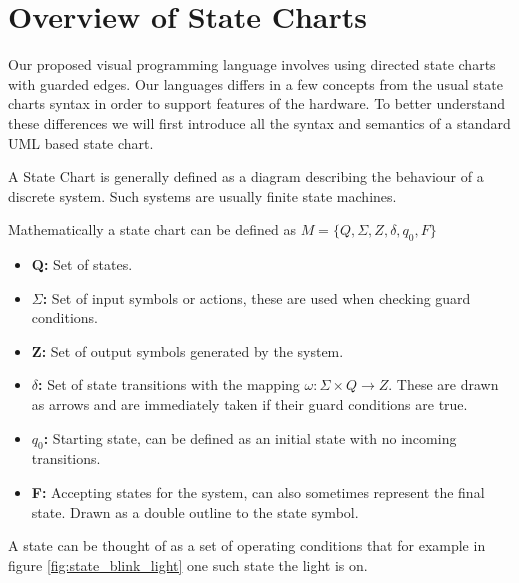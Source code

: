 \section{Overview of State Charts} \label{sec:overviewstatechart}

Our proposed visual programming language involves using directed state charts with guarded edges. Our languages differs in a few concepts from the usual state charts syntax in order to support features of the hardware. To better understand these differences we will first introduce all the syntax and semantics of a standard UML based state chart.

A State Chart\cite{StateChartVis} is generally defined as a diagram describing the behaviour of a discrete system. Such systems are usually finite state machines. 

Mathematically a state chart can be defined as $M = \lbrace Q, \Sigma, Z, \delta, q_0, F \rbrace$

\begin{itemize}
	\item \textbf{Q:} Set of states.
	\item \textbf{$\Sigma$:} Set of input symbols or actions, these are used when checking guard conditions.
	\item \textbf{Z:} Set of output symbols generated by the system.
	\item \textbf{$\delta$:} Set of state transitions with the mapping $\omega: \Sigma \times Q \rightarrow Z$. These are drawn as arrows and are immediately taken if their guard conditions are true.
	\item \textbf{$q_0$:} Starting state, can be defined as an initial state with no incoming transitions.
	\item \textbf{F:} Accepting states for the system, can also sometimes represent the final state. Drawn as a double outline to the state symbol.
\end{itemize}

A state can be thought of as a set of operating conditions that for example in figure \ref{fig:state_blink_light}
one such state the light is on.

